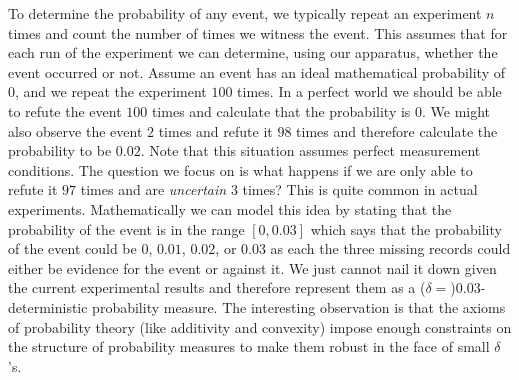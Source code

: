 \documentclass[english,reprint, aps, prl,superscriptaddress, showpacs,
showkeys, longbibliography, amsmath, amssymb, floatfix]{revtex4-1}
\theoremstyle{plain}
\theoremstyle{definition}
\begin{document}
To determine the probability of any event,
we typically repeat an experiment $n$ times and count the number
of times we witness the event. This assumes that for each run of the
experiment we can determine, using our apparatus, whether the event
occurred or not. Assume an event has an ideal mathematical probability
of $0$, and we repeat the experiment $100$ times. In a perfect world
we should be able to refute the event $100$ times and calculate that
the probability is $0$. We might also observe the event $2$ times
and refute it $98$ times and therefore calculate the probability
to be $0.02$. Note that this situation assumes perfect measurement
conditions.
The question we focus on is what happens if we are only able to refute
it $97$ times and are \emph{uncertain} $3$ times? This is quite
common in actual experiments. Mathematically we can model this idea
by stating that the probability of the event is in the range $\left[0,0.03\right]$
which says that the probability of the event could be $0$, $0.01$,
$0.02$, or $0.03$ as each the three missing records could either
be evidence for the event or against it. We just cannot nail it down
given the current experimental results and therefore represent them as a ($\delta=$)$0.03$-deterministic
probability measure. The interesting observation is that the axioms
of probability theory (like additivity and convexity) impose enough
constraints on the structure of probability measures to make them
robust in the face of small $\delta$'s.
\end{document}
